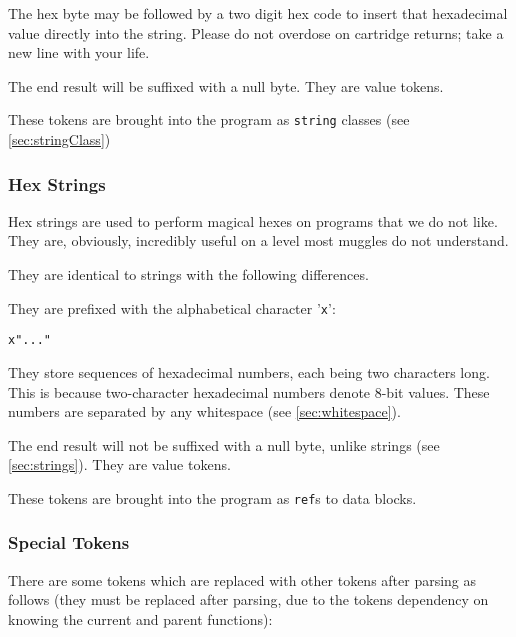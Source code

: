 \documentclass[10pt,a4paper]{article}
\begin{document}
The hex byte may be followed by a two digit hex code to insert that hexadecimal value directly into the string. Please do not overdose on cartridge returns; take a new line with your life. 

The end result will be suffixed with a null byte. They are value tokens.

These tokens are brought into the program as \verb|string| classes (see \ref{sec:stringClass})

\subsubsection{Hex Strings}
Hex strings are used to perform magical hexes on programs that we do not like. They are, obviously, incredibly useful on a level most muggles do not understand.

They are identical to strings with the following differences.

They are prefixed with the alphabetical character '\verb|x|':
\begin{verbatim}
x"..."
\end{verbatim}

They store sequences of hexadecimal numbers, each being two characters long. This is because two-character hexadecimal numbers denote 8-bit values. These numbers are separated by any whitespace (see \ref{sec:whitespace}). 

The end result will not be suffixed with a null byte, unlike strings (see \ref{sec:strings}). They are value tokens.

These tokens are brought into the program as \verb|ref|s to data blocks.

\subsubsection{Special Tokens}
\label{sec:specialTokens}
There are some tokens which are replaced with other tokens after parsing as follows (they must be replaced after parsing, due to the tokens dependency on knowing the current and parent functions):
\end{document}
